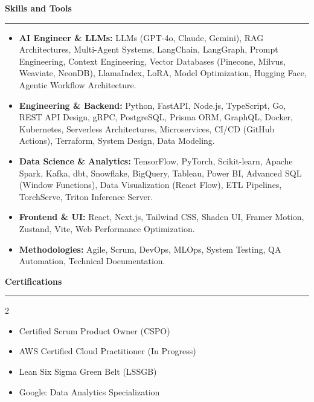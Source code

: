 \documentclass[9pt,letterpaper]{article} %
\newenvironment{rSection}[1]{ %
  \sectionskip
 \textbf{\Large #1} %
  \sectionlineskip
  \hrule %
  \begin{list}{}{ %
    \setlength{\leftmargin}{-0em} %
  }
  \item[]
}{
  \end{list}
}
\def\sectionlineskip{\smallskip} %
\def\sectionskip{} %
\begin{document}
\begin{rSection}{Skills and Tools}
\begin{itemize}[left=-1.5em, labelsep=.1cm, labelwidth=.2cm, itemsep=0.0em, topsep=0pt]
\item \textbf{AI Engineer \& LLMs:} LLMs (GPT-4o, Claude, Gemini), RAG Architectures, Multi-Agent Systems, LangChain, LangGraph, Prompt Engineering, Context Engineering, Vector Databases (Pinecone, Milvus, Weaviate, NeonDB), LlamaIndex, LoRA, Model Optimization, Hugging Face, Agentic Workflow Architecture.
\item \textbf{Engineering \& Backend:} Python, FastAPI, Node.js, TypeScript, Go, REST API Design, gRPC, PostgreSQL, Prisma ORM, GraphQL, Docker, Kubernetes, Serverless Architectures, Microservices, CI/CD (GitHub Actions), Terraform, System Design, Data Modeling.
\item \textbf{Data Science \& Analytics:} TensorFlow, PyTorch, Scikit-learn, Apache Spark, Kafka, dbt, Snowflake, BigQuery, Tableau, Power BI, Advanced SQL (Window Functions), Data Visualization (React Flow), ETL Pipelines, TorchServe, Triton Inference Server.
\item \textbf{Frontend \& UI:} React, Next.js, Tailwind CSS, Shadcn UI, Framer Motion, Zustand, Vite, Web Performance Optimization.
\item \textbf{Methodologies:} Agile, Scrum, DevOps, MLOps, System Testing, QA Automation, Technical Documentation.
\end{itemize}
\end{rSection}%
\begin{rSection}{Certifications}
\begin{multicols}{2}
\begin{itemize}[left=-1.5em, labelsep=.1cm, labelwidth=.2cm, itemsep=0.0em, topsep=0pt]
\item Certified Scrum Product Owner (CSPO)
\item AWS Certified Cloud Practitioner (In Progress)
\item Lean Six Sigma Green Belt (LSSGB)
\item Google: Data Analytics Specialization
\end{itemize}
\end{multicols}
\end{rSection}
\end{document}
